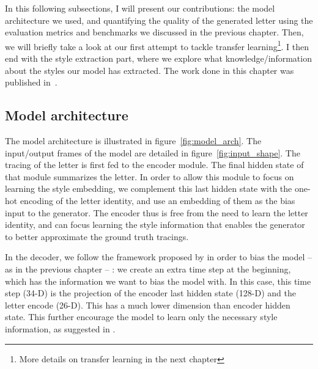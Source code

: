   \par In this following subsections, I will present our contributions: the model architecture we used, and quantifying the quality of the generated letter using the evaluation metrics and benchmarks we discussed in the previous chapter. Then, we will briefly take a look at our first attempt to tackle transfer learning\footnote{More details on transfer learning in the next chapter}. I then end with the style extraction part, where we explore what knowledge/information about the styles our model has extracted. The work done in this chapter was published in~\citep{icaart19}.

  \subsection{Model architecture}
     \par The model architecture is illustrated in figure~\ref{fig:model_arch}. The input/output frames of the model are detailed in figure~\ref{fig:input_shape}. The tracing of the letter is first fed to the encoder module. The final hidden state of that module summarizes the letter. In order to allow this module to focus on learning the style embedding, we complement this last hidden state with the one-hot encoding of the letter identity, and use an embedding of them as the bias input to the generator. The encoder thus is free from the need to learn the letter identity, and can focus learning the style information that enables the generator to better approximate the ground truth tracings.

    \par In the decoder, we follow the framework proposed by \cite{vinyals2015show} in order to bias the model -- as in the previous chapter -- : we create an extra time step at the beginning, which has the information we want to bias the model with. In this case, this time step (34-D) is the projection of the encoder last hidden state (128-D) and the letter encode (26-D). This has a much lower dimension than encoder hidden state. This further encourage the model to learn only the necessary style information, as suggested in \cite{DBLP:journals/corr/abs-1803-09047}.

